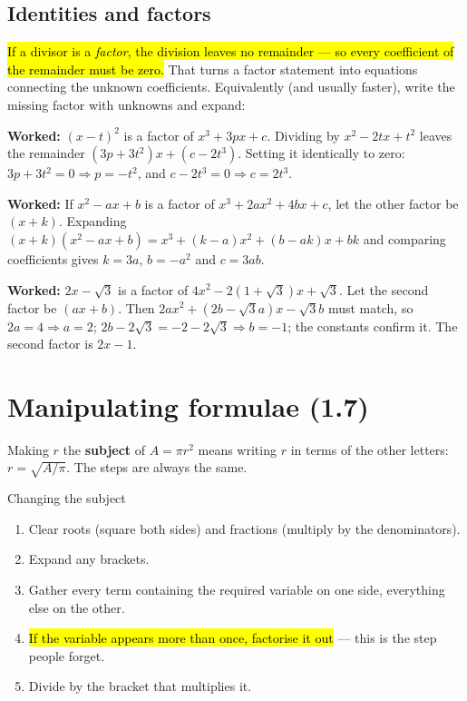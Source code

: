 \documentclass[11pt]{article}
\newcommand{\key}[1]{\hl{#1}}
\newcommand{\wex}[1]{\textbf{\color{lilacdeep}Worked:} #1}
\begin{document}
\subsection*{Identities and factors}

\key{If a divisor is a \emph{factor}, the division leaves no remainder --- so every coefficient of the remainder must be zero.} That turns a factor statement into equations connecting the unknown coefficients. Equivalently (and usually faster), write the missing factor with unknowns and expand:

\wex{$(x-t)^{2}$ is a factor of $x^{3}+3px+c$. Dividing by $x^{2}-2tx+t^{2}$ leaves the remainder $(3p+3t^{2})x+(c-2t^{3})$. Setting it identically to zero: $3p+3t^{2}=0\Rightarrow p=-t^{2}$, and $c-2t^{3}=0\Rightarrow c=2t^{3}$.}

\wex{If $x^{2}-ax+b$ is a factor of $x^{3}+2ax^{2}+4bx+c$, let the other factor be $(x+k)$. Expanding $(x+k)(x^{2}-ax+b)=x^{3}+(k-a)x^{2}+(b-ak)x+bk$ and comparing coefficients gives $k=3a$, $b=-a^{2}$ and $c=3ab$.}

\wex{$2x-\sqrt3$ is a factor of $4x^{2}-2(1+\sqrt3)x+\sqrt3$. Let the second factor be $(ax+b)$. Then $2ax^{2}+(2b-\sqrt3a)x-\sqrt3b$ must match, so $2a=4\Rightarrow a=2$; $2b-2\sqrt3=-2-2\sqrt3\Rightarrow b=-1$; the constants confirm it. The second factor is $2x-1$.}

\section{Manipulating formulae (1.7)}

Making $r$ the \textbf{subject} of $A=\pi r^{2}$ means writing $r$ in terms of the other letters: $r=\sqrt{A/\pi}$. The steps are always the same.

\begin{methodbox}{Changing the subject}
\begin{enumerate}[topsep=1pt,itemsep=0pt,leftmargin=*]
\item Clear roots (square both sides) and fractions (multiply by the denominators).
\item Expand any brackets.
\item Gather every term containing the required variable on one side, everything else on the other.
\item \key{If the variable appears more than once, factorise it out} --- this is the step people forget.
\item Divide by the bracket that multiplies it.
\end{enumerate}
\end{methodbox}
\end{document}
